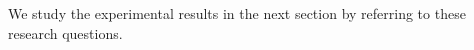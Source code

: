 %
%
%	
%	
%	
%	
%	


We study the experimental results in the next section by referring to these research questions.

